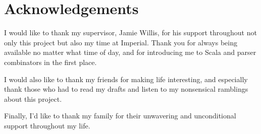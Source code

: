 \documentclass[../../main.tex]{subfiles}
\begin{document}
\hspace{0pt}
\vfill
\section*{\centering Acknowledgements}
\noindent
I would like to thank my supervisor, Jamie Willis, for his support throughout not only this project but also my time at Imperial.
Thank you for always being available no matter what time of day, and for introducing me to Scala and parser combinators in the first place.
\newline

\noindent
I would also like to thank my friends for making life interesting, and especially thank those who had to read my drafts and listen to my nonsensical ramblings about this project.
\newline

\noindent
Finally, I'd like to thank my family for their unwavering and unconditional support throughout my life.
\vfill
\hspace{0pt}
\end{document}
